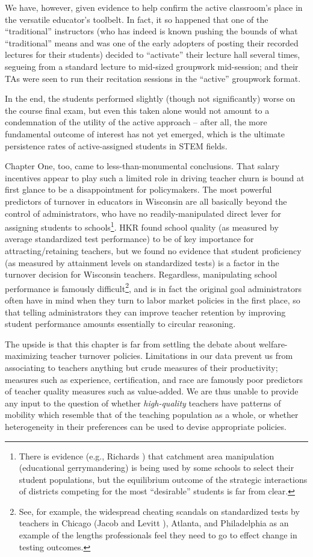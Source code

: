 We have, however, given evidence to help confirm the active classroom's
place in the versatile educator's toolbelt. In fact, it so happened that
one of the ``traditional'' instructors (who has indeed is known pushing
the bounds of what ``traditional'' means and was one of the early
adopters of posting their recorded lectures for their students) decided
to ``activate'' their lecture hall several times, segueing from a
standard lecture to mid-sized groupwork mid-session; and their TAs were
seen to run their recitation sessions in the ``active'' groupwork
format.

In the end, the students performed slightly (though not significantly)
worse on the course final exam, but even this taken alone would not
amount to a condemnation of the utility of the active approach -- after
all, the more fundamental outcome of interest has not yet emerged, which
is the ultimate persistence rates of active-assigned students in STEM
fields.

Chapter One, too, came to less-than-monumental conclusions. That salary incentives appear to play such a limited role in driving
teacher churn is bound at first glance to be a disappointment for
policymakers. The most powerful predictors of turnover in educators in
Wisconsin are all basically beyond the control of administrators, who
have no readily-manipulated direct lever for assigning students to
schools\footnote{There is evidence (e.g., Richards
  \citeyear{richards}) that catchment area
  manipulation (educational gerrymandering) is being used by some
  schools to select their student populations, but the equilibrium
  outcome of the strategic interactions of districts competing for the
  most ``desirable'' students is far from clear.}. HKR found school
quality (as measured by average standardized test performance) to be of
key importance for attracting/retaining teachers, but we found no
evidence that student proficiency (as measured by attainment levels on
standardized tests) is a factor in the turnover decision for Wisconsin
teachers. Regardless, manipulating school performance is famously
difficult\footnote{See, for example, the widespread cheating scandals on
  standardized tests by teachers in Chicago (Jacob and Levitt
  \citeyear{jacob}), Atlanta, and Philadelphia as an
  example of the lengths professionals feel they need to go to effect
  change in testing outcomes.}, and is in fact the original goal
administrators often have in mind when they turn to labor market
policies in the first place, so that telling administrators they can
improve teacher retention by improving student performance amounts
essentially to circular reasoning.

The upside is that this chapter is far from settling the debate about
welfare-maximizing teacher turnover policies. Limitations in our data
prevent us from associating to teachers anything but crude measures of
their productivity; measures such as experience, certification, and race
are famously poor predictors of teacher quality measures such as
value-added. We are thus unable to provide any input to the question of
whether \emph{high-quality} teachers have patterns of mobility which
resemble that of the teaching population as a whole, or whether
heterogeneity in their preferences can be used to devise appropriate
policies.
